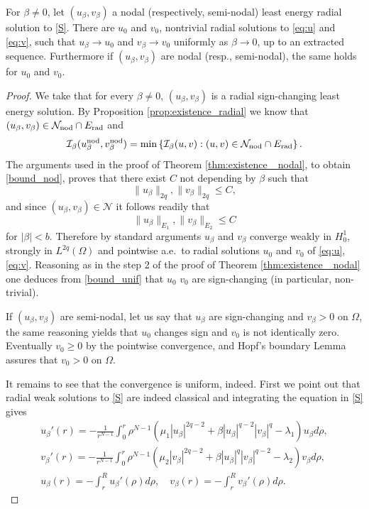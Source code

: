 \documentclass[reqno]{amsart}
\begin{document}
\begin{lemma}\label{lem:stability}
For $\beta\neq 0$, let $(u_{\beta}, v_{\beta})$ a nodal (respectively, semi-nodal)
least energy radial solution to \eqref{S}.
There are $u_0$ and $v_0$, nontrivial  radial solutions to \eqref{eq:u} and
\eqref{eq:v}, such that  $u_{\beta}\to u_0$ and  $v_{\beta}\to v_0$  uniformly
as $\beta\to0$, up to an extracted sequence.
Furthermore if $(u_{\beta}, v_{\beta})$ are nodal (resp., semi-nodal), the same
holds for $u_0$ and $v_0$.
 \end{lemma}

\begin{proof}
We take that for every $\beta\neq 0$, $(u_\beta, v_\beta)$ is a radial sign-changing
least energy solution.
By Proposition \ref{prop:existence_radial} we know that
$(u_\beta, v_\beta)\in \mathcal N_{\rm nod} \cap E_{\rm rad}$ and
\[
  \mathcal I_{\beta}(u^{\rm nod}_{\beta}, v^{\rm nod}_{\beta})
  = \min \left\{ \mathcal I_{\beta}(u,v) : (u,v) \in \mathcal N_{\rm nod}
  \cap E_{\rm rad}\right\} .
\]
The  arguments used in the proof of Theorem \ref{thm:existence_ nodal},
to obtain \eqref{bound_nod}, proves that there exist $C$ not depending by $\beta$
such that
\begin{equation} \label{bound_unif}
\|u_{\beta}\|_{2q},  \|v_{\beta}\|_{2q} \le C,
\end{equation}
and since $(u_{\beta},v_{\beta})\in \mathcal N$ it follows readily that
\begin{equation} \label{bound_unif_E}
 \|u_{\beta}\|_{E_1},  \|v_{\beta}\|_{E_2} \le C
\end{equation}
for $|\beta|<b$.
Therefore by standard arguments $u_{\beta}$ and $v_{\beta}$ converge weakly in $H^1_0$,
strongly in $L^{2q}(\Omega)$ and pointwise a.e.~to radial solutions $u_0$ and $v_0$
of \eqref{eq:u}, \eqref{eq:v}.
Reasoning as in the step 2 of the proof of Theorem \ref{thm:existence_ nodal} one
deduces from \eqref{bound_unif} that $u_0$ $v_0$ are sign-changing
(in particular, non-trivial).

If $(u_\beta, v_\beta)$ are semi-nodal, let us say that $u_{\beta}$ are sign-changing
and $v_{\beta}>0$ on $\Omega$, the same reasoning yields that $u_0$ changes sign and
$v_0$ is not identically zero.
Eventually $v_0\ge0$ by the pointwise convergence, and  Hopf's boundary Lemma assures
that $v_0>0$ on $\Omega$.

It remains to see that the convergence is uniform, indeed.
First we point out that radial weak solutions to \eqref{S} are indeed classical
and integrating the equation in \eqref{S} gives
\begin{gather}\label{u'}
 u_{\beta}'(r)=-\frac{1}{r^{N-1}} \int_0^r \rho^{N-1}
  \left( \mu_1|u_{\beta}|^{2q-2}+\beta |u_{\beta}|^{q-2}|v_{\beta}|^q -\lambda_1
  \right) u_{\beta} d\rho , \\
\label{v'}
  v_{\beta}'(r)=-\frac{1}{r^{N-1}} \int_0^r \rho^{N-1}
  \left( \mu_2|v_{\beta}|^{2q-2}+\beta |u_{\beta}|^{q}|v_{\beta}|^{q-2} -\lambda_2 \right)
   v_{\beta} d\rho, \\
 \label{uv}
  u_{\beta}(r)= - \int_r^R  u_{\beta}'(\rho) d\rho , \quad  v_{\beta}(r)
  = - \int_r^R  v_{\beta}'(\rho) d\rho .
 \end{gather}


\end{proof}
\end{document}
